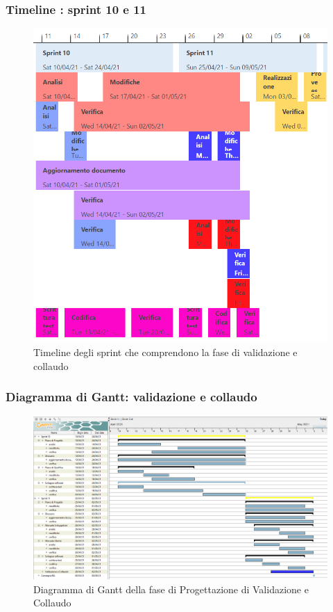 \subsubsection{Timeline : sprint 10 e 11}
\begin{figure}[H]
    \centering
    \includegraphics[scale = 0.5]{components/img/sprint10-11.png}
    \caption{Timeline degli sprint che comprendono la  fase di validazione e collaudo}
    \label{fig:Timeline,sprint 10 e 11, fase di validazione e collaudo}
\end{figure}

\subsubsection{Diagramma di Gantt: validazione e collaudo}
\begin{figure}[H]
    \centering
    \includegraphics[scale = 0.25]{components/img/validazione_collaudo.png}
    \caption{Diagramma di Gantt della fase di Progettazione di Validazione e Collaudo}
    \label{fig:Diagramma di Gantt, fase di Validazione e collaudo}
\end{figure}
